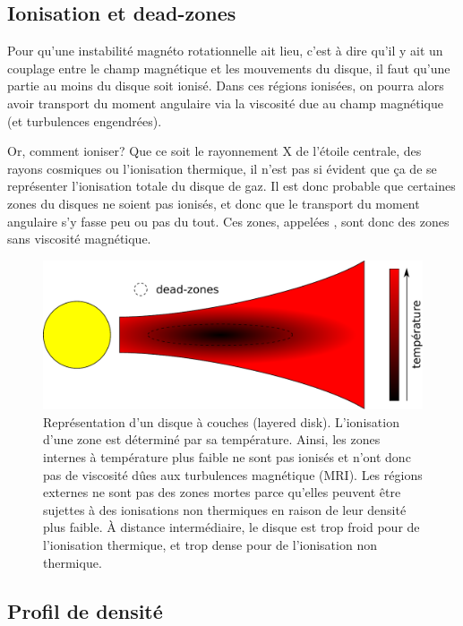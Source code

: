 \subsection{Ionisation et dead-zones}
Pour qu'une instabilité magnéto rotationnelle ait lieu, c'est à dire qu'il y ait un couplage entre le champ magnétique et les mouvements du disque, il faut qu'une partie au moins du disque soit ionisé. Dans ces régions ionisées, on pourra alors avoir transport du moment angulaire via la viscosité due au champ magnétique (et turbulences engendrées). 

Or, comment ioniser? Que ce soit le rayonnement X de l'étoile centrale, des rayons cosmiques ou l'ionisation thermique, il n'est pas si évident que ça de se représenter l'ionisation totale du disque de gaz. Il est donc probable que certaines zones du disques ne soient pas ionisés, et donc que le transport du moment angulaire s'y fasse peu ou pas du tout. Ces zones, appelées , sont donc des zones sans viscosité magnétique. %

\begin{figure}[htb]
\centering
\includegraphics[width=0.7\linewidth]{figure/dead_zones.pdf}
\caption{Représentation d'un disque à couches (layered disk). L'ionisation d'une zone est déterminé par sa température. Ainsi, les zones internes à température plus faible ne sont pas ionisés et n'ont donc pas de viscosité dûes aux turbulences magnétique (MRI). Les régions externes ne sont pas des zones mortes parce qu'elles peuvent être sujettes à des ionisations non thermiques en raison de leur densité plus faible. À distance intermédiaire, le disque est trop froid pour de l'ionisation thermique, et trop dense pour de l'ionisation non thermique.}\label{fig:dead_zones}
\end{figure}



\subsection{Profil de densité}
